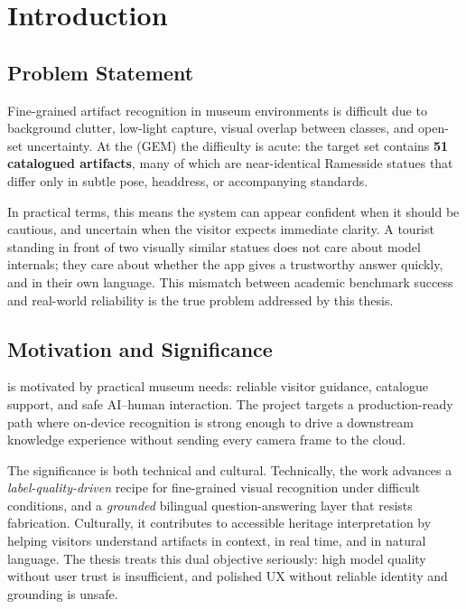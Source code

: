 \chapter{Introduction}

\section{Problem Statement}

Fine-grained artifact recognition in museum environments is difficult due to
background clutter, low-light capture, visual overlap between classes, and open-set
uncertainty. At the \GEM{} (GEM) the difficulty is acute: the target set contains
\textbf{51 catalogued artifacts}, many of which are near-identical Ramesside statues
that differ only in subtle pose, headdress, or accompanying standards.

In practical terms, this means the system can appear confident when it should be
cautious, and uncertain when the visitor expects immediate clarity. A tourist
standing in front of two visually similar statues does not care about model
internals; they care about whether the app gives a trustworthy answer quickly, and
in their own language. This mismatch between academic benchmark success and
real-world reliability is the true problem addressed by this thesis.

\section{Motivation and Significance}

\TimeLens{} is motivated by practical museum needs: reliable visitor guidance,
catalogue support, and safe AI--human interaction. The project targets a
production-ready path where on-device recognition is strong enough to drive a
downstream knowledge experience without sending every camera frame to the cloud.

The significance is both technical and cultural. Technically, the work advances a
\emph{label-quality-driven} recipe for fine-grained visual recognition under
difficult conditions, and a \emph{grounded} bilingual question-answering layer that
resists fabrication. Culturally, it contributes to accessible heritage
interpretation by helping visitors understand artifacts in context, in real time,
and in natural language. The thesis treats this dual objective seriously: high model
quality without user trust is insufficient, and polished UX without reliable identity
and grounding is unsafe.

